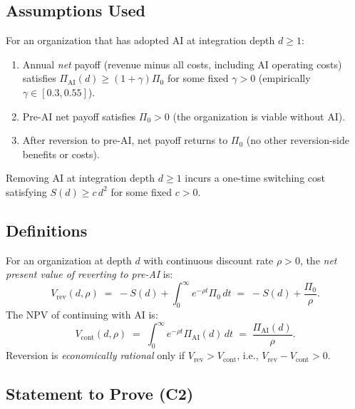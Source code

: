 

\subsection*{Assumptions Used}

\begin{assumption}\label{A2}
  For an organization that has adopted AI at integration depth $d \geq 1$:
  \begin{enumerate}
    \item Annual \emph{net} payoff (revenue minus all costs, including AI
      operating costs) satisfies $\Pi_{\mathrm{AI}}(d) \geq (1+\gamma)\Pi_0$
      for some fixed $\gamma > 0$ (empirically $\gamma \in [0.3,0.55]$).
    \item Pre-AI net payoff satisfies $\Pi_0 > 0$ (the organization is
      viable without AI).
    \item After reversion to pre-AI, net payoff returns to $\Pi_0$ (no
      other reversion-side benefits or costs).
  \end{enumerate}
\end{assumption}

\begin{assumption}\label{A4}
  Removing AI at integration depth $d \geq 1$ incurs a one-time
  switching cost satisfying $S(d) \geq c\,d^2$ for some fixed $c > 0$.
\end{assumption}

\subsection*{Definitions}

\begin{definition}\label{defNPV}
  For an organization at depth $d$ with continuous discount rate $\rho > 0$,
  the \emph{net present value of reverting to pre-AI} is:
  \[
    V_{\mathrm{rev}}(d,\rho)
    \;=\; -S(d) + \int_0^\infty e^{-\rho t}\Pi_0\,dt
    \;=\; -S(d) + \frac{\Pi_0}{\rho}.
  \]
  The NPV of continuing with AI is:
  \[
    V_{\mathrm{cont}}(d,\rho)
    \;=\; \int_0^\infty e^{-\rho t}\Pi_{\mathrm{AI}}(d)\,dt
    \;=\; \frac{\Pi_{\mathrm{AI}}(d)}{\rho}.
  \]
  Reversion is \emph{economically rational} only if
  $V_{\mathrm{rev}} > V_{\mathrm{cont}}$, i.e.,
  $V_{\mathrm{rev}} - V_{\mathrm{cont}} > 0$.
\end{definition}

\subsection*{Statement to Prove (C2)}

